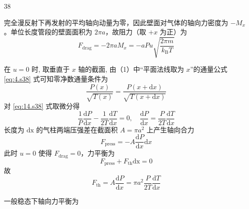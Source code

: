\begin{solution}{38}
\begin{subsolution}
\begin{subsubsolution}
\begin{equation}
                \label{eq:12.s38}
            \end{equation}
            完全漫反射下再发射的平均轴向动量为零，因此壁面对气体的轴向力密度为 $-M_{x}$。单位长度管段的壁面面积为 $2\pi a$，故阻力（取 $+x$ 为正）为
            \begin{equation}
                F _ {\mathrm{drag}} = - 2 \pi a M _ {x} = - a P u \sqrt {\frac {2 \pi m}{k _ {\mathrm{B}} T}}
                \label{eq:13.s38}
            \end{equation}
        \end{subsubsolution}
    \end{subsolution}
    \begin{subsolution}
        在 $u = 0$ 时, 取垂直于 $x$ 轴的截面, 由（1）中“平面法线取为 $x$”的通量公式 \eqref{eq:4.s38} 式可知零净数通量条件为
        \begin{equation}
            \frac {P (x)}{\sqrt {T (x)}} = \frac {P (x + \mathrm{d} x)}{\sqrt {T (x + \mathrm{d} x)}}
            \label{eq:14.s38}
        \end{equation}
        对 \eqref{eq:14.s38} 式取微分得
        \begin{equation}
            \frac {1}{P} \frac {\mathrm{d} P}{\mathrm{d} x} - \frac {1}{2 T} \frac {\mathrm{d} T}{\mathrm{d} x} = 0, \quad \frac {\mathrm{d} P}{\mathrm{d} x} = \frac {P}{2 T} \frac {\mathrm{d} T}{\mathrm{d} x}
            \label{eq:15.s38}
        \end{equation}
        长度为 $\mathrm{dx}$ 的气柱两端压强差在截面积 $A = \pi a^2$ 上产生轴向合力
        \begin{equation}
            F _ {\mathrm{press}} = - A \frac {\mathrm{d} P}{\mathrm{d} x} \mathrm{d} x
            \label{eq:16.s38}
        \end{equation}
        此时 $u = 0$ 使得 $F_{\mathrm{drag}} = 0$，力平衡为
        \begin{equation}
            F _ {\mathrm{press}} + F _ {\mathrm{th}} \mathrm{dx} = 0
            \label{eq:17.s38}
        \end{equation}
        故
        \begin{equation}
            F _ {\mathrm{th}} = A \frac {\mathrm{d} P}{\mathrm{d} x} = \pi a ^ {2} \frac {P}{2 T} \frac {\mathrm{d} T}{\mathrm{d} x}
            \label{eq:18.s38}
        \end{equation}
    \end{subsolution}
    \begin{subsolution}
        一般稳态下轴向力平衡为
        \begin{equation}

\end{equation}
\end{subsolution}
\end{solution}
